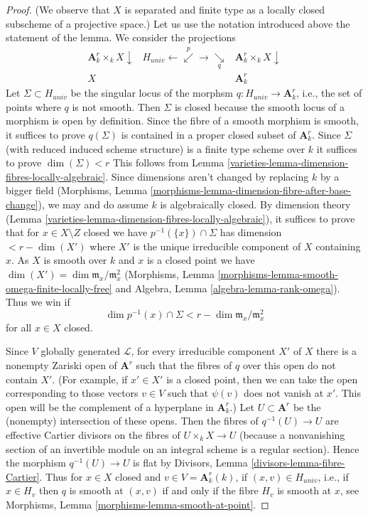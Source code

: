 \begin{proof}

(We observe that $X$ is separated and finite type as a locally
closed subscheme of a projective space.)
Let us use the notation introduced above the statement of the lemma.
We consider the projections
$$
\begin{array}{ccc}\mathbf{A}^r_k \times_k X \downarrow & H_{univ} \longleftarrow\overset{p}{\swarrow}\longrightarrow\underset{q}{\searrow} & \mathbf{A}^r_k \times_k X \downarrow \\ X &  & \mathbf{A}^r_k\end{array}
$$
Let $\Sigma \subset H_{univ}$ be the singular locus of the morphsm
$q : H_{univ} \to \mathbf{A}^r_k$, i.e., the set of points where
$q$ is not smooth. Then $\Sigma$ is closed because the smooth locus
of a morphism is open by definition. Since the fibre of a
smooth morphism is smooth, it suffices to prove $q(\Sigma)$
is contained in a proper closed subset of $\mathbf{A}^r_k$.
Since $\Sigma$ (with reduced induced scheme structure) is a
finite type scheme over $k$ it suffices to prove $\dim(\Sigma) < r$
This follows from Lemma \ref{varieties-lemma-dimension-fibres-locally-algebraic}.
Since dimensions aren't changed by replacing $k$ by a bigger field
(Morphisms, Lemma \ref{morphisms-lemma-dimension-fibre-after-base-change}),
we may and do assume $k$ is algebraically closed.
By dimension theory (Lemma \ref{varieties-lemma-dimension-fibres-locally-algebraic}),
it suffices to prove that for $x \in X \setminus Z$ closed we have
$p^{-1}(\{x\}) \cap \Sigma$ has dimension $< r - \dim(X')$
where $X'$ is the unique irreducible component of $X$ containing $x$.
As $X$ is smooth over $k$ and $x$ is a closed point we have
$\dim(X') = \dim \mathfrak m_x/\mathfrak m_x^2$
(Morphisms, Lemma \ref{morphisms-lemma-smooth-omega-finite-locally-free}
and Algebra, Lemma \ref{algebra-lemma-rank-omega}).
Thus we win if
$$
\dim p^{-1}(x) \cap \Sigma < r - \dim \mathfrak m_x/\mathfrak m_x^2
$$
for all $x \in X$ closed.

\medskip\noindent
Since $V$ globally generated $\mathcal{L}$, for every irreducible component
$X'$ of $X$ there is a nonempty Zariski open of $\mathbf{A}^r$ such that the
fibres of $q$ over this open do not contain $X'$. (For example, if $x' \in X'$
is a closed point, then we can take the open corresponding to those
vectors $v \in V$ such that $\psi(v)$ does not vanish at $x'$. This
open will be the complement of a hyperplane in $\mathbf{A}^r_k$.)
Let $U \subset \mathbf{A}^r$ be the (nonempty) intersection of these opens.
Then the fibres of $q^{-1}(U) \to U$ are effective Cartier divisors
on the fibres of $U \times_k X \to U$ (because a nonvanishing section
of an invertible module on an integral scheme is a regular section). Hence the
morphism $q^{-1}(U) \to U$ is flat by
Divisors, Lemma \ref{divisors-lemma-fibre-Cartier}.
Thus for $x \in X$ closed and $v \in V = \mathbf{A}^r_k(k)$,
if $(x, v) \in H_{univ}$, i.e., if $x \in H_v$
then $q$ is smooth at $(x, v)$ if and only if the fibre
$H_v$ is smooth at $x$, see
Morphisms, Lemma \ref{morphisms-lemma-smooth-at-point}.


\end{proof}
